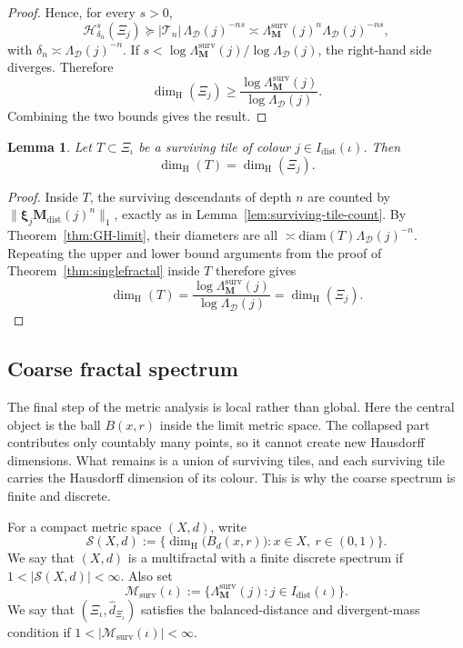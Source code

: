 \documentclass[12pt]{iopart}
\newtheorem{lemma}[theorem]{Lemma}
\newcommand*{\dist}{d}
\newcommand*{\bbbxi}{\boldsymbol{\xi}}
\newcommand*{\diam}{\mathrm{diam}}
\newcommand*{\dimh}{\dim_\mathrm{H}}
\begin{document}
\begin{proof}
Hence, for every $s>0$,
\[
\mathcal H^s_{\delta_n}(\Xi_j)
\succeq
|\mathcal T_n|\,\Lambda_{\mathcal D}(j)^{-ns}
\asymp
\Lambda_{\mathbf M}^{\mathrm{surv}}(j)^n\Lambda_{\mathcal D}(j)^{-ns},
\]
with $\delta_n\asymp \Lambda_{\mathcal D}(j)^{-n}$.
If $s<\log\Lambda_{\mathbf M}^{\mathrm{surv}}(j)/\log\Lambda_{\mathcal D}(j)$, the right-hand side diverges.
Therefore
\[
\dimh(\Xi_j)
\ge
\frac{\log \Lambda_{\mathbf M}^{\mathrm{surv}}(j)}{\log \Lambda_{\mathcal D}(j)}.
\]
Combining the two bounds gives the result.
\end{proof}

\begin{lemma}\label{lem:tile-dimension}
Let $T\subset \Xi_\iota$ be a surviving tile of colour $j\in I_{\mathrm{dist}}(\iota)$.
Then
\[
\dimh(T)=\dimh(\Xi_j).
\]
\end{lemma}

\begin{proof}
Inside $T$, the surviving descendants of depth $n$ are counted by
$\|\bbbxi_j\mathbf M_{\mathrm{dist}}(j)^n\|_1$, exactly as in Lemma~\ref{lem:surviving-tile-count}.
By Theorem~\ref{thm:GH-limit}, their diameters are all $\asymp \diam(T)\Lambda_{\mathcal D}(j)^{-n}$.
Repeating the upper and lower bound arguments from the proof of Theorem~\ref{thm:singlefractal} inside $T$ therefore gives
\[
\dimh(T)
=
\frac{
\log \Lambda_{\mathbf M}^{\mathrm{surv}}(j)
}{
\log \Lambda_{\mathcal D}(j)
}
=
\dimh(\Xi_j).
\]
\end{proof}

\subsection{Coarse fractal spectrum}

The final step of the metric analysis is local rather than global.
Here the central object is the ball $B(x,r)$ inside the limit metric space.
The collapsed part contributes only countably many points, so it cannot create new Hausdorff dimensions.
What remains is a union of surviving tiles, and each surviving tile carries the Hausdorff dimension of its colour.
This is why the coarse spectrum is finite and discrete.

For a compact metric space $(X,d)$, write
\[
\mathscr S(X,d)
:=
\Big\{
\dimh\big(B_d(x,r)\big):
x\in X,\ r\in(0,1)
\Big\}.
\]
We say that $(X,d)$ is a multifractal with a finite discrete spectrum if
$1<|\mathscr S(X,d)|<\infty$.
Also set
\[
\mathscr M_{\mathrm{surv}}(\iota)
:=
\big\{
\Lambda_{\mathbf M}^{\mathrm{surv}}(j):
j\in I_{\mathrm{dist}}(\iota)
\big\}.
\]
We say that $(\Xi_\iota,\hat\dist_{\Xi_\iota})$ satisfies the balanced-distance and divergent-mass condition if
$1<|\mathscr M_{\mathrm{surv}}(\iota)|<\infty$.
\end{document}
